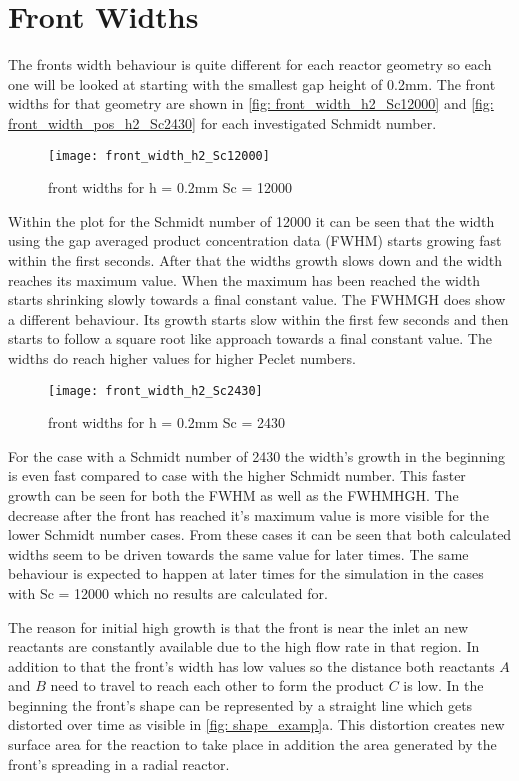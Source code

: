 \documentclass[../thesis.tex]{subfiles}
\begin{document}
\section{Front Widths}

The fronts width behaviour is quite different for each reactor geometry so each one will be looked at starting with the smallest gap height of 0.2mm. The front widths for that geometry are shown in \autoref{fig: front_width_h2_Sc12000} and \autoref{fig: front_width_pos_h2_Sc2430} for each investigated Schmidt number.
\begin{figure}[htbp]
	\centering
	\texttt{[image: front\_width\_h2\_Sc12000]}
	\caption{front widths for  h = 0.2mm Sc = 12000
	\label{fig: front_width_h2_Sc12000}}
\end{figure}
Within the plot for the Schmidt number of 12000 it can be seen that the width using the gap averaged product concentration data (FWHM) starts growing fast within the first seconds. After that the widths growth slows down and the width reaches its maximum value. When the maximum has been reached the width starts shrinking slowly towards a final constant value. The FWHMGH does show a different behaviour. Its growth starts slow within the first few seconds and then starts to follow a square root like approach towards a final constant value. The widths do reach higher values for higher Peclet numbers.
\begin{figure}[htbp]
	\centering
	\texttt{[image: front\_width\_h2\_Sc2430]}
	\caption{front widths for  h = 0.2mm Sc = 2430
		\label{fig: front_width_pos_h2_Sc2430}}
\end{figure}
For the case with a Schmidt number of 2430 the width's growth in the beginning is even fast compared to case with the higher Schmidt number. This faster growth can be seen for both the FWHM as well as the FWHMHGH. The decrease after the front has reached it's maximum value is more visible for the lower Schmidt number cases. From these cases it can be seen that both calculated widths seem to be driven towards the same value for later times. The same behaviour is expected to happen at later times for the simulation in the cases with Sc = 12000 which no results are calculated for.

The reason for initial high growth is that the front is near the inlet an new reactants are constantly available due to the high flow rate in that region. In addition to that the front's width has low values so the distance both reactants $A$ and $B$ need to travel to reach each other to form the product $C$ is low. In the beginning the front's shape can be represented by a straight line which gets distorted over time as visible in \autoref{fig: shape_examp}a. This distortion creates new surface area for the reaction to take place in addition the area generated by the front's spreading in a radial reactor.
\end{document}
